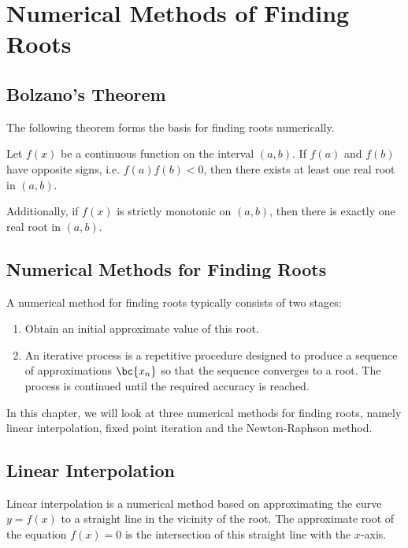 \chapter{Numerical Methods of Finding Roots}

\section{Bolzano's Theorem}\label{S:Bolzano}

The following theorem forms the basis for finding roots numerically.

\begin{theorem}
    Let $f(x)$ be a continuous function on the interval $(a, b)$. If $f(a)$ and $f(b)$ have opposite signs, i.e. $f(a) f(b) < 0$, then there exists at least one real root in $(a, b)$.
\end{theorem}

Additionally, if $f(x)$ is strictly monotonic on $(a, b)$, then there is exactly one real root in $(a, b)$.

\section{Numerical Methods for Finding Roots}

A numerical method for finding roots typically consists of two stages:
\begin{enumerate}
    \item {}
    
    Obtain an initial approximate value of this root.
    \item {}

    An iterative process is a repetitive procedure designed to produce a sequence of approximations $\bc{x_n}$ so that the sequence converges to a root. The process is continued until the required accuracy is reached.
\end{enumerate}

In this chapter, we will look at three numerical methods for finding roots, namely linear interpolation, fixed point iteration and the Newton-Raphson method.

\section{Linear Interpolation}

Linear interpolation is a numerical method based on approximating the curve $y = f(x)$ to a straight line in the vicinity of the root. The approximate root of the equation $f(x) = 0$ is the intersection of this straight line with the $x$-axis.

